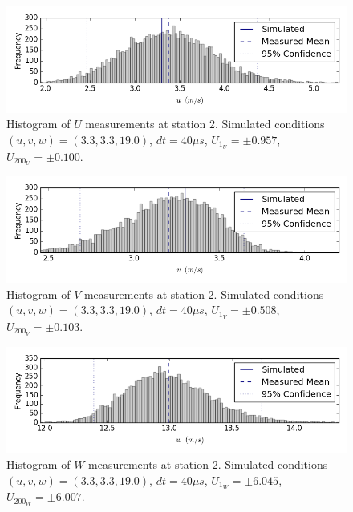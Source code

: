 \begin{figure}[H]
\centering
\includegraphics[width=6in]{figs/Ely_May28th02002/uncertainty_Ely_May28th02002_U}
\caption{Histogram of $U$ measurements at station 2. Simulated conditions 
$(u,v,w)=(3.3, 3.3, 19.0)$, $dt=40 \mu s$, $U_{1_{U}}=\pm 0.957$, 
$U_{200_{U}}=\pm 0.100$.}
\label{fig:uncertainty_Ely_May28th02002_U}
\end{figure}


\begin{figure}[H]
\centering
\includegraphics[width=6in]{figs/Ely_May28th02002/uncertainty_Ely_May28th02002_V}
\caption{Histogram of $V$ measurements at station 2. Simulated conditions 
$(u,v,w)=(3.3, 3.3, 19.0)$, $dt=40 \mu s$, $U_{1_{V}}=\pm 0.508$, 
$U_{200_{V}}=\pm 0.103$.}
\label{fig:uncertainty_Ely_May28th02002_V}
\end{figure}


\begin{figure}[H]
\centering
\includegraphics[width=6in]{figs/Ely_May28th02002/uncertainty_Ely_May28th02002_W}
\caption{Histogram of $W$ measurements at station 2. Simulated conditions 
$(u,v,w)=(3.3, 3.3, 19.0)$, $dt=40 \mu s$, $U_{1_{W}}=\pm 6.045$, 
$U_{200_{W}}=\pm 6.007$.}
\label{fig:uncertainty_Ely_May28th02002_W}
\end{figure}


